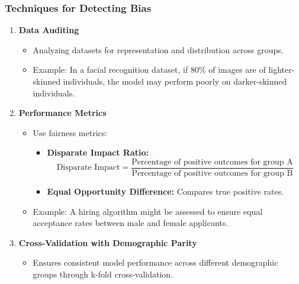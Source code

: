 \documentclass{beamer}
\begin{document}
\begin{frame}[fragile]
    \frametitle{Techniques for Detecting Bias}
    \begin{enumerate}
        \item \textbf{Data Auditing}
            \begin{itemize}
                \item Analyzing datasets for representation and distribution across groups.
                \item Example: In a facial recognition dataset, if 80\% of images are of lighter-skinned individuals, the model may perform poorly on darker-skinned individuals.
            \end{itemize}
        \item \textbf{Performance Metrics}
            \begin{itemize}
                \item Use fairness metrics:
                    \begin{itemize}
                        \item \textbf{Disparate Impact Ratio:} 
                            \begin{equation}
                                \text{Disparate Impact} = \frac{\text{Percentage of positive outcomes for group A}}{\text{Percentage of positive outcomes for group B}}
                            \end{equation}
                        \item \textbf{Equal Opportunity Difference:} Compares true positive rates.
                    \end{itemize}
                \item Example: A hiring algorithm might be assessed to ensure equal acceptance rates between male and female applicants.
            \end{itemize}
        \item \textbf{Cross-Validation with Demographic Parity}
            \begin{itemize}
                \item Ensures consistent model performance across different demographic groups through k-fold cross-validation.
            \end{itemize}
    \end{enumerate}
\end{frame}
\end{document}
